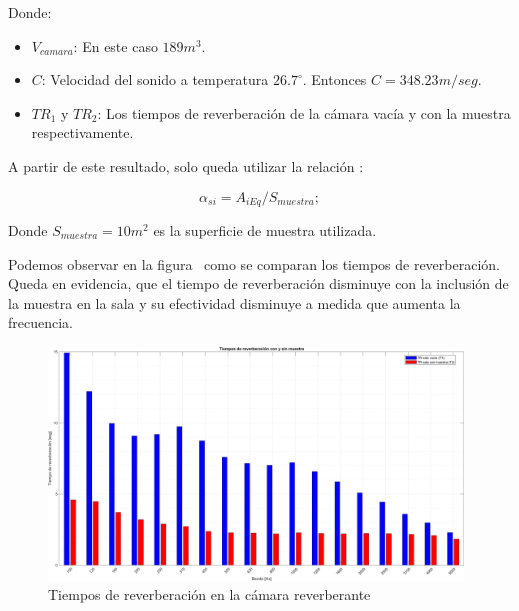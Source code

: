 \par Donde:
\begin{itemize}
    \item $V_{camara}$: En este caso $189m^3$.
    \item $C$: Velocidad del sonido a temperatura $26.7^\circ$. Entonces $C= 348.23 m/seg$.
    \item $TR_1$ y $TR_2$: Los tiempos de reverberación de la cámara vacía y con la muestra respectivamente.
\end{itemize}

\par A partir de este resultado, solo queda utilizar la relación :

\begin{equation}
    \alpha_{si} = A_{iEq} / S_{muestra};
\end{equation}

\par Donde $S_{muestra} = 10m^2$ es la superficie de muestra utilizada.\\


\par Podemos observar en la figura~ como se comparan los tiempos de reverberación. Queda en evidencia, que el tiempo de reverberación disminuye con la inclusión de la muestra en la sala y su efectividad disminuye a medida que aumenta la frecuencia.



\begin{figure}[H]
	\centering
	\includegraphics[width=0.98\textwidth]{./img/Tiempos_reverberacion_bars.png}
	\caption{Tiempos de reverberación en la cámara reverberante}
	\label{fig::tiempos_reverberacion}
\end{figure}


